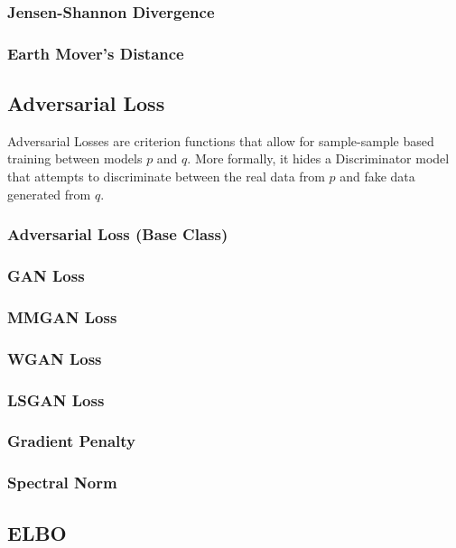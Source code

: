 \subsubsection{Jensen-Shannon Divergence}
\subsubsection{Earth Mover's Distance}

\subsection{Adversarial Loss}
Adversarial Losses are criterion functions that allow for sample-sample based
training between models $p$ and $q$. More formally, it hides a Discriminator
model that attempts to discriminate between the real data from $p$ and fake data
generated from $q$.
\subsubsection{Adversarial Loss (Base Class)}
\subsubsection{GAN Loss}
\subsubsection{MMGAN Loss}
\subsubsection{WGAN Loss}
\subsubsection{LSGAN Loss}
\subsubsection{Gradient Penalty}
\subsubsection{Spectral Norm}

\subsection{ELBO}
